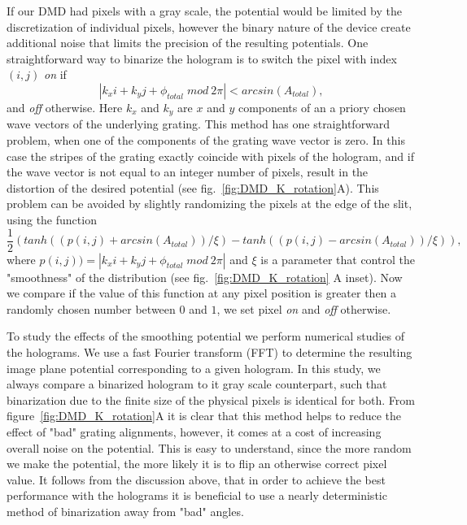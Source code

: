 If our DMD had pixels with a gray scale, the potential would be limited by the discretization of individual pixels, however the binary nature of the device create additional noise that limits the precision of the resulting potentials. One straightforward way to binarize the hologram is to switch the pixel with index $(i,j)$ \textit{on} if 
\begin{equation}
\left| k_x i + k_y j + \phi_{total} \; mod \: 2 \pi \right| < arcsin(A_{total}),
\end{equation}
and \textit{off} otherwise. Here $k_x$ and $k_y$ are $x$ and $y$ components of an a priory chosen wave vectors of the underlying grating. This method has one straightforward problem, when one of the components of the grating wave vector is zero. In this case the stripes of the grating exactly coincide with pixels of the hologram, and if the wave vector is not equal to an integer number of pixels, result in the distortion of the desired potential (see fig.~\ref{fig:DMD_K_rotation}A). This problem can be avoided by slightly randomizing the pixels at the edge of the slit, using the function 
\begin{equation}
\frac{1}{2}(tanh((p(i,j) + arcsin(A_{total}))/\xi) - tanh((p(i,j) - arcsin(A_{total}))/\xi)),
\end{equation}
where $p(i,j))=\left| k_x i + k_y j + \phi_{total} \; mod \: 2 \pi \right|$ and $\xi$ is a parameter that control the "smoothness" of the distribution (see fig.~\ref{fig:DMD_K_rotation} A inset). Now we compare if the value of this function at any pixel position is greater then a randomly chosen number between $0$ and $1$, we set pixel \textit{on} and \textit{off} otherwise. 

To study the effects of the smoothing potential we perform numerical studies of the holograms. We use a fast Fourier transform (FFT) to determine the resulting image plane potential corresponding to a given hologram. In this study, we always compare a binarized hologram to it gray scale counterpart, such that binarization due to the finite size of the physical pixels is identical for both. From figure~\ref{fig:DMD_K_rotation}A it is clear that this method helps to reduce the effect of "bad" grating alignments, however, it comes at a cost of increasing overall noise on the potential. This is easy to understand, since the more random we make the potential, the more likely it is to flip an otherwise correct pixel value. It follows from the discussion above, that in order to achieve the best performance with the holograms it is beneficial to use a nearly deterministic method of binarization away from "bad" angles. 

